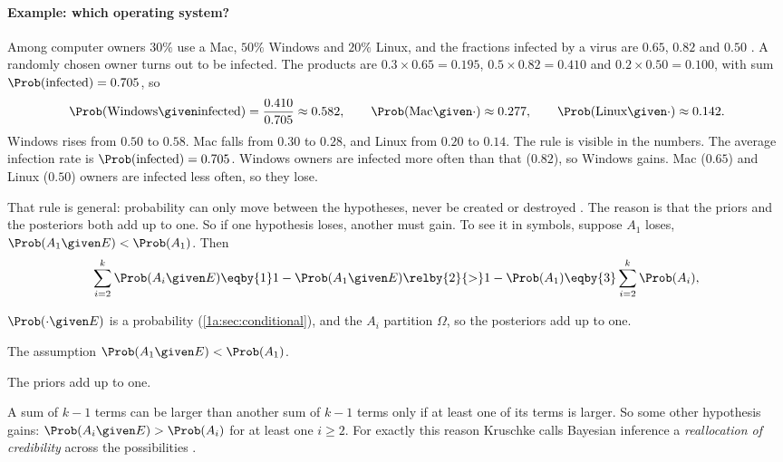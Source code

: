 \paragraph{Example: which operating system?}
Among computer owners $30\%$ use a Mac, $50\%$ Windows and $20\%$ Linux, and the
fractions infected by a virus are $0.65$, $0.82$ and $0.50$ . A randomly chosen owner turns out to be infected. The products are
$0.3\times0.65=0.195$, $0.5\times0.82=0.410$ and $0.2\times0.50=0.100$, with sum
$\Prob(\text{infected})=0.705$, so
\begin{align*}
\Prob(\text{Windows}\given\text{infected})=\frac{0.410}{0.705}\approx0.582,\qquad
\Prob(\text{Mac}\given\cdot)\approx0.277,\qquad
\Prob(\text{Linux}\given\cdot)\approx0.142 .
\end{align*}
Windows rises from $0.50$ to $0.58$. Mac falls from $0.30$ to $0.28$, and Linux
from $0.20$ to $0.14$. The rule is visible in the numbers. The average infection
rate is $\Prob(\text{infected})=0.705$. Windows owners are infected more often
than that ($0.82$), so Windows gains. Mac ($0.65$) and Linux ($0.50$) owners are
infected less often, so they lose.

That rule is general: probability can only move between the hypotheses, never
be created or destroyed . The reason is that the priors
and the posteriors both add up to one. So if one hypothesis loses, another must
gain. To see it in symbols, suppose $A_1$ loses, $\Prob(A_1\given E)<\Prob(A_1)$.
Then
\begin{align*}
\sum_{i=2}^k\Prob(A_i\given E)\eqby{1}1-\Prob(A_1\given E)\relby{2}{>}1-\Prob(A_1)\eqby{3}\sum_{i=2}^k\Prob(A_i),
\end{align*}
\begin{explain}
  \item $\Prob(\cdot\given E)$ is a probability (\cref{1a:sec:conditional}), and the
        $A_i$ partition $\Omega$, so the posteriors add up to one.
  \item The assumption $\Prob(A_1\given E)<\Prob(A_1)$.
  \item The priors add up to one.
\end{explain}
A sum of $k-1$ terms can be larger than another sum of $k-1$ terms only if at
least one of its terms is larger. So some other hypothesis gains:
$\Prob(A_i\given E)>\Prob(A_i)$ for at least one $i\geq2$. For exactly this reason
Kruschke calls Bayesian inference a \emph{reallocation of credibility} across the
possibilities .

